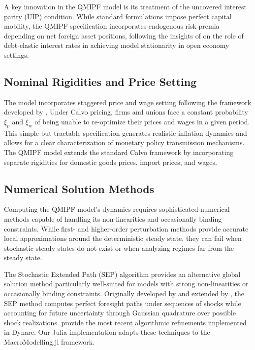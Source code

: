 \documentclass[12pt]{article}
\begin{document}
A key innovation in the QMIPF model is its treatment of the uncovered interest parity (UIP) condition. While standard formulations impose perfect capital mobility, the QMIPF specification incorporates endogenous risk premia depending on net foreign asset positions, following the insights of \citet{schmitt2003closing} on the role of debt-elastic interest rates in achieving model stationarity in open economy settings.

\subsection{Nominal Rigidities and Price Setting}

The model incorporates staggered price and wage setting following the framework developed by \citet{calvo1983staggered}. Under Calvo pricing, firms and unions face a constant probability $\xi_p$ and $\xi_w$ of being unable to re-optimize their prices and wages in a given period. This simple but tractable specification generates realistic inflation dynamics and allows for a clear characterization of monetary policy transmission mechanisms. The QMIPF model extends the standard Calvo framework by incorporating separate rigidities for domestic goods prices, import prices, and wages.

\subsection{Numerical Solution Methods}

Computing the QMIPF model's dynamics requires sophisticated numerical methods capable of handling its non-linearities and occasionally binding constraints. While first- and higher-order perturbation methods \citep{schmitt2004solving,andreasen2018pruning} provide accurate local approximations around the deterministic steady state, they can fail when stochastic steady states do not exist or when analyzing regimes far from the steady state.

The Stochastic Extended Path (SEP) algorithm provides an alternative global solution method particularly well-suited for models with strong non-linearities or occasionally binding constraints. Originally developed by \citet{fair1983solution} and extended by \citet{adjemian2013stochastic}, the SEP method computes perfect foresight paths under sequences of shocks while accounting for future uncertainty through Gaussian quadrature over possible shock realizations. \citet{adjemian2025stochastic} provide the most recent algorithmic refinements implemented in Dynare. Our Julia implementation adapts these techniques to the MacroModelling.jl framework.
\end{document}
